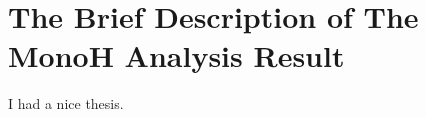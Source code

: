 \documentclass[class=NTHU_thesis, crop=false]{standalone}
\begin{document}
\chapter{The Brief Description of The MonoH Analysis Result}
I had a nice thesis.
\end{document}
